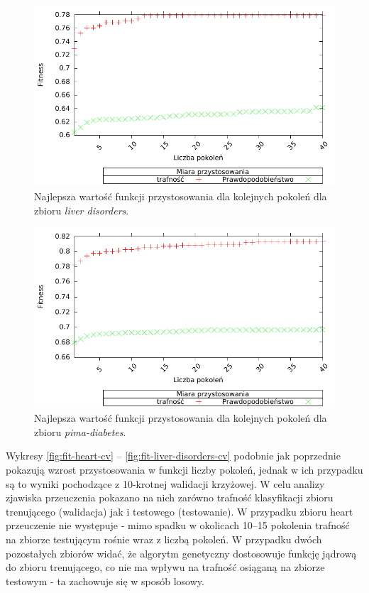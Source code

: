         \begin{figure}
                \includegraphics[scale=0.90]{figures/results/fitness/fitness-liver-disorders}
                \caption{Najlepsza wartość funkcji przystosowania dla kolejnych pokoleń dla zbioru \emph{liver disorders}.\label{fig:fit-liver-disorders}}
        \end{figure}    

        \begin{figure}
                \includegraphics[scale=0.90]{figures/results/fitness/fitness-pima-diabetes}
                \caption{Najlepsza wartość funkcji przystosowania dla kolejnych pokoleń dla zbioru \emph{pima-diabetes}.\label{fig:fit-pima-diabetes}}
        \end{figure}    

Wykresy \ref{fig:fit-heart-cv} -- \ref{fig:fit-liver-disorders-cv} podobnie jak poprzednie pokazują wzrost przystosowania w funkcji liczby pokoleń, jednak w ich przypadku są to wyniki pochodzące z 10-krotnej walidacji krzyżowej. W celu analizy zjawiska przeuczenia pokazano na nich zarówno trafność klasyfikacji zbioru trenującego (walidacja) jak i testowego (testowanie). W przypadku zbioru heart przeuczenie nie występuje - mimo spadku w okolicach 10--15 pokolenia trafność na zbiorze testującym rośnie wraz z liczbą pokoleń. W przypadku dwóch pozostałych zbiorów widać, że algorytm genetyczny dostosowuje funkcję jądrową do zbioru trenującego, co nie ma wpływu na trafność osiąganą na zbiorze testowym - ta zachowuje się w sposób losowy.

